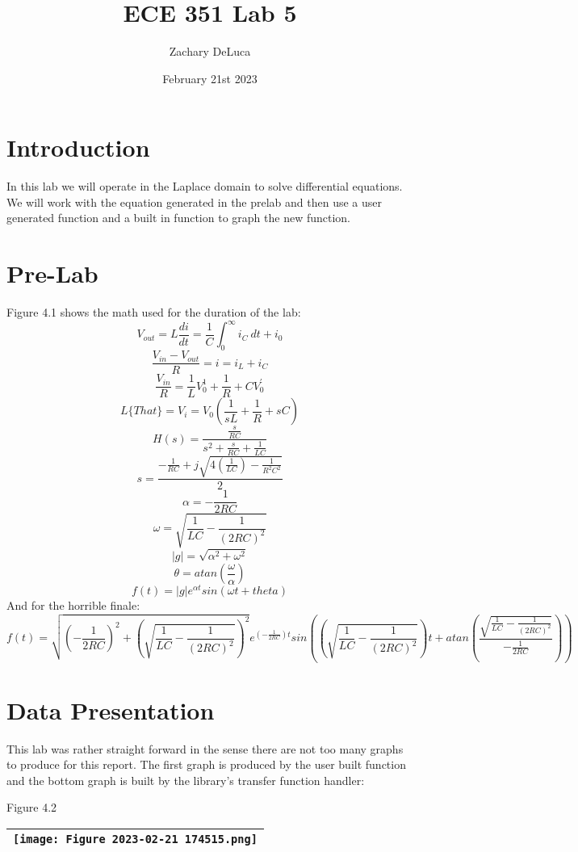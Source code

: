 \documentclass[12pt,a4paper]{article}
\title{ECE 351 Lab 5}
\author{Zachary DeLuca  }
\date{February 21st 2023}
\begin{document}
\maketitle
\hline
\section{Introduction}
In this lab we will operate in the Laplace domain to solve differential equations. We will work with the equation generated in the prelab and then use a user generated function and a built in function to graph the new function. 
\section{Pre-Lab}
Figure 4.1 shows the math used for the duration of the lab: 
$$V_{out} = L\frac{di}{dt} = \frac{1}{C}\int_0^\infty i_C\ dt+i_0$$
$$\frac{V_{in}-V_{out}}{R}=i=i_L+i_C$$
$$\frac{V_{in}}{R}=\frac{1}{L}V_0^1+\frac{1}{R}+CV_0^'$$
$$L\{That\}=V_i=V_0(\frac{1}{sL} + \frac{1}{R}+sC)$$
$$H(s) = \frac{\frac{s}{RC}}{s^2+\frac{s}{RC}+\frac{1}{LC}}$$
$$s=\frac{-\frac{1}{RC}+j\sqrt{4(\frac{1}{LC})-\frac{1}{R^2C^2}}}{2}$$
$$\alpha = -\frac{1}{2RC}$$
$$\omega = \sqrt{\frac{1}{LC}-\frac{1}{(2RC)^2}}$$
$$|g| = \sqrt{\alpha^2+\omega^2}$$
$$\theta = atan(\frac{\omega}{\alpha})$$
$$f(t)=|g|e^{\alpha t}sin(\omega t +theta)$$
And for the horrible finale: \\
$$f(t)=\sqrt{(-\frac{1}{2RC})^2+(\sqrt{\frac{1}{LC}-\frac{1}{(2RC)^2}})^2}e^{(-\frac{1}{2RC}) t}sin((\sqrt{\frac{1}{LC}-\frac{1}{(2RC)^2}}) t +atan(\frac{\sqrt{\frac{1}{LC}-\frac{1}{(2RC)^2}}}{-\frac{1}{2RC}}))$$
\section{Data Presentation}
This lab was rather straight forward in the sense there are not too many graphs to produce for this report. The first graph is produced by the user built function and the bottom graph is built by the library's transfer function handler: \\ 
\begin{center}
        \centering
        Figure 4.2\\
        \begin{tabular}{|c|}
        \hline
        \texttt{[image: Figure 2023-02-21 174515.png]}
        \\\hline
        \end{tabular}
        \label{Table 5.1}
\end{center}
\end{document}
